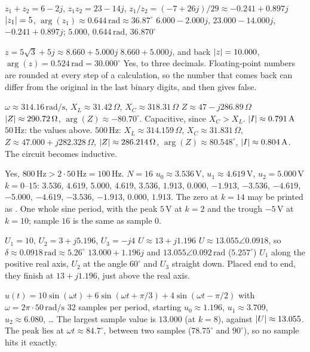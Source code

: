 \begin{facit}
  $z_1 + z_2 = 6 - 2j$, $z_1 z_2 = 23 - 14j$,
$z_1/z_2 = (-7 + 26j)/29 \approx -0.241 + 0.897j$
 $\lvert z_1\rvert = 5$, $\arg(z_1) \approx 0.644\,\text{rad} \approx 36.87^{\circ}$
 $6.000 - 2.000j$, $23.000 - 14.000j$, $-0.241 + 0.897j$; $5.000$,
$0.644\,\text{rad}$, $36.870^{\circ}$

  $z = 5\sqrt{3} + 5j \approx 8.660 + 5.000j$
 $8.660 + 5.000j$, and back $\lvert z\rvert = 10.000$,
$\arg(z) = 0.524\,\text{rad} = 30.000^{\circ}$
 Yes, to three decimals. Floating-point numbers are rounded at every step of a calculation,
so the number that comes back can differ from the original in the last binary digits, and then
\code{==} gives false.

  $\omega \approx 314.16\,\text{rad/s}$, $X_L \approx 31.42\,\Omega$,
$X_C \approx 318.31\,\Omega$
 $Z \approx 47 - j286.89\,\Omega$
 $\lvert Z\rvert \approx 290.72\,\Omega$, $\arg(Z) \approx -80.70^{\circ}$. Capacitive, since
$X_C > X_L$.
 $\lvert I\rvert \approx 0.791\,\text{A}$
 $50\,\text{Hz}$: the values above. $500\,\text{Hz}$: $X_L \approx 314.159\,\Omega$,
$X_C \approx 31.831\,\Omega$, $Z \approx 47.000 + j282.328\,\Omega$,
$\lvert Z\rvert \approx 286.214\,\Omega$, $\arg(Z) \approx 80.548^{\circ}$,
$\lvert I\rvert \approx 0.804\,\text{A}$. The circuit becomes inductive.

  Yes, $800\,\text{Hz} > 2 \cdot 50\,\text{Hz} = 100\,\text{Hz}$.
 $N = 16$
 $u_0 \approx 3.536\,\text{V}$, $u_1 \approx 4.619\,\text{V}$, $u_2 = 5.000\,\text{V}$
 $k = 0$--$15$: $3.536$, $4.619$, $5.000$, $4.619$, $3.536$, $1.913$, $0.000$, $-1.913$,
$-3.536$, $-4.619$, $-5.000$, $-4.619$, $-3.536$, $-1.913$, $0.000$, $1.913$. The zero at
$k = 14$ may be printed as .
 One whole sine period, with the peak $5\,\text{V}$ at $k = 2$ and the trough $-5\,\text{V}$
at $k = 10$; sample $16$ is the same as sample $0$.

  $U_1 = 10$, $U_2 = 3 + j5.196$, $U_3 = -j4$
 $U \approx 13 + j1.196$
 $U \approx 13.055\angle 0.0918$, so $\delta \approx 0.0918\,\text{rad}
\approx 5.26^{\circ}$
 $13.000 + 1.196j$ and $13.055\angle 0.092\,\text{rad}$ ($5.257^{\circ}$)
 $U_1$ along the positive real axis, $U_2$ at the angle $60^{\circ}$ and $U_3$ straight
down. Placed end to end, they finish at $13 + j1.196$, just above the real axis.

  $u(t) = 10\sin(\omega t) + 6\sin(\omega t + \pi/3) + 4\sin(\omega t - \pi/2)$
with $\omega = 2\pi \cdot 50\,\text{rad/s}$
 $32$ samples per period, starting $u_0 \approx 1.196$, $u_1 \approx 3.709$,
$u_2 \approx 6.080$, \ldots
{} The largest sample value is $13.000$ (at $k = 8$), against $\lvert U\rvert \approx 13.055$. The
peak lies at $\omega t \approx 84.7^{\circ}$, between two samples ($78.75^{\circ}$ and
$90^{\circ}$), so no sample hits it exactly.


\end{facit}
